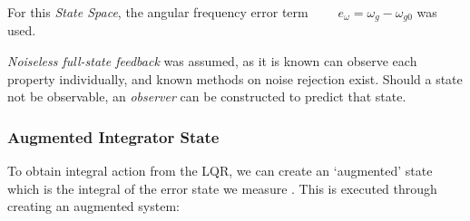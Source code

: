 %

For this \emph{State Space}, the angular frequency error term $\qquad e_{\omega} = \omega_{g} - \omega_{g0}$ was used.

\emph{Noiseless full-state feedback} was assumed, as it is known can observe each property individually, and known methods on noise rejection exist.
Should a state not be observable, an \emph{observer} can be constructed to predict that state. \cite{power:controlman}

\subsubsection{Augmented Integrator State}

To obtain integral action from the LQR, we can create an `augmented' state which is the integral of the error state we measure \cite{power:augstate}. This is executed through creating an augmented system:

